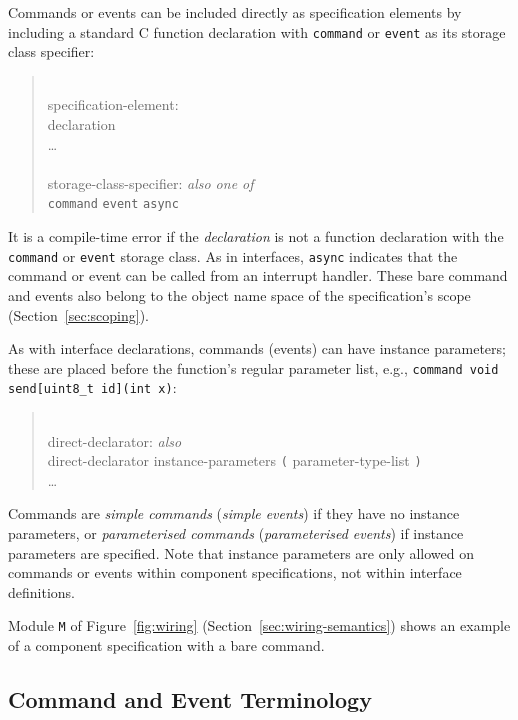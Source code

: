 \documentclass[11pt,letterpaper]{article}
\newcommand{\kw}[1]{{\tt #1}}
\newcommand{\code}[1]{{\tt #1}}
\newcommand{\grammarshift}{\vspace*{-.7cm}}
\newcommand{\grammarindent}{\hspace*{2cm}\= \\ \kill}
\begin{document}
Commands or events can be included directly as specification elements by
including a standard C function declaration with
\kw{command} or \kw{event} as its storage class specifier:
\begin{quote} \grammarshift \em \begin{tabbing}
\grammarindent
specification-element:\\
\>	declaration\\
\>	\ldots\\
\\
storage-class-specifier: \emph{also one of}\\
\>	\kw{command} \kw{event} \kw{async}\\
\end{tabbing} \end{quote}
It is a compile-time error if the \emph{declaration} is not a function
declaration with the \kw{command} or \kw{event} storage class. As in
interfaces, \kw{async} indicates that the command or event can be called
from an interrupt handler. These bare command and events also belong to the
object name space of the specification's scope (Section~\ref{sec:scoping}).

As with interface declarations, commands (events) can have instance
parameters; these are placed before
the function's regular parameter list, e.g., \code{command void
send[uint8\_t id](int x)}: 
\begin{quote} \grammarshift \em \begin{tabbing}
\grammarindent
direct-declarator: \emph{also}\\
\>	direct-declarator instance-parameters \kw{(} parameter-type-list \kw{)}\\
\>	\ldots
\end{tabbing} \end{quote}

Commands are \emph{simple commands} (\emph{simple events}) if they have no
instance parameters, or \emph{parameterised commands} (\emph{parameterised
events}) if instance parameters are specified. Note that instance
parameters are only allowed on commands or events within component
specifications, not within interface definitions.

Module \code{M} of Figure~\ref{fig:wiring}
(Section~\ref{sec:wiring-semantics}) shows an example of a component
specification with a bare command.

\subsection{Command and Event Terminology}
\end{document}

